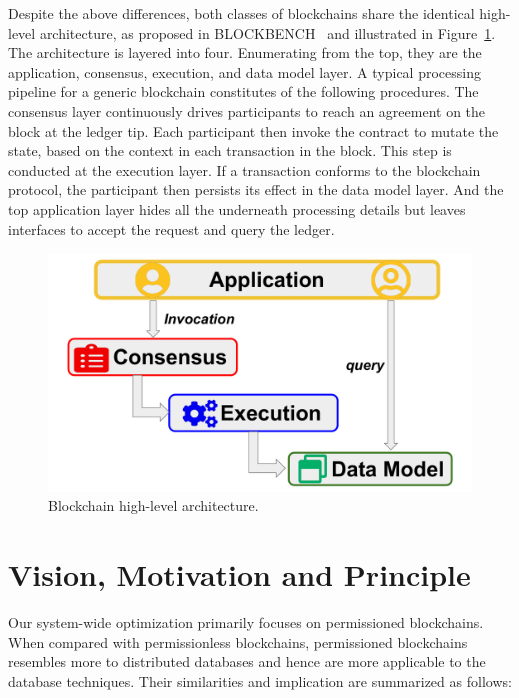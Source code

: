 Despite the above differences, both classes of blockchains share the identical high-level architecture, as proposed in BLOCKBENCH~\cite{dinh2017blockbench} and illustrated in Figure~\ref{diagram:intro:arch}. 
The architecture is layered into four. Enumerating from the top, they are the application, consensus, execution, and data model layer. 
A typical processing pipeline for a generic blockchain constitutes of the following procedures. 
The consensus layer continuously drives participants to reach an agreement on the block at the ledger tip. 
Each participant then invoke the contract to mutate the state, based on the context in each transaction in the block. 
This step is conducted at the execution layer.
If a transaction conforms to the blockchain protocol, the participant then persists its effect in the data model layer. 
And the top application layer hides all the underneath processing details but leaves interfaces to accept the request and query the ledger. 

\begin{figure}[!t]
  \centering
  \includegraphics[width=0.8\linewidth]{diagram/intro/architecture.pdf}
  \vspace{\BeforeCaptionVSpace}
  \caption{Blockchain high-level architecture. }
  \label{diagram:intro:arch}
\end{figure}

\section{Vision, Motivation and Principle}

Our system-wide optimization primarily focuses on permissioned blockchains.
When compared with permissionless blockchains, permissioned blockchains resembles more to distributed databases and hence are more applicable to the database techniques.  
Their similarities and implication are summarized as follows: 

